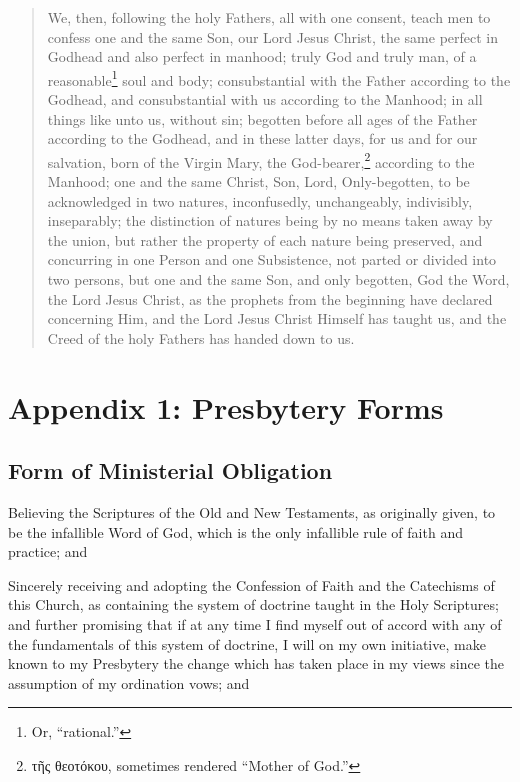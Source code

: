 \documentclass[
]{book}
\begin{document}
\begin{quote}
We, then, following the holy Fathers, all with one consent, teach men to confess one and the same Son, our Lord Jesus Christ, the same perfect in Godhead and also perfect in manhood; truly God and truly man, of a reasonable\footnote{Or, ``rational.''} soul and body; consubstantial with the Father according to the Godhead, and consubstantial with us according to the Manhood; in all things like unto us, without sin; begotten before all ages of the Father according to the Godhead, and in these latter days, for us and for our salvation, born of the Virgin Mary, the God-bearer,\footnote{τῆς θεοτόκου, sometimes rendered ``Mother of God.''} according to the Manhood; one and the same Christ, Son, Lord, Only-begotten, to be acknowledged in two natures, inconfusedly, unchangeably, indivisibly, inseparably; the distinction of natures being by no means taken away by the union, but rather the property of each nature being preserved, and concurring in one Person and one Subsistence, not parted or divided into two persons, but one and the same Son, and only begotten, God the Word, the Lord Jesus Christ, as the prophets from the beginning have declared concerning Him, and the Lord Jesus Christ Himself has taught us, and the Creed of the holy Fathers has handed down to us.
\end{quote}

\hypertarget{appendix-1-presbytery-forms}{%
\chapter*{Appendix 1: Presbytery Forms}\label{appendix-1-presbytery-forms}}

\hypertarget{form-of-ministerial-obligation}{%
\section*{Form of Ministerial Obligation}\label{form-of-ministerial-obligation}}

\protect\hypertarget{chapter-form-of-ministerial-obligation}{\href{}{}}

\protect\hypertarget{form-of-ministerial-obligation}{\href{}{}}Believing the Scriptures of the Old and New Testaments, as originally given, to be the infallible Word of God, which is the only infallible rule of faith and practice; and

Sincerely receiving and adopting the Confession of Faith and the Catechisms of this Church, as containing the system of doctrine taught in the Holy Scriptures; and further promising that if at any time I find myself out of accord with any of the fundamentals of this system of doctrine, I will on my own initiative, make known to my Presbytery the change which has taken place in my views since the assumption of my ordination vows; and
\end{document}
